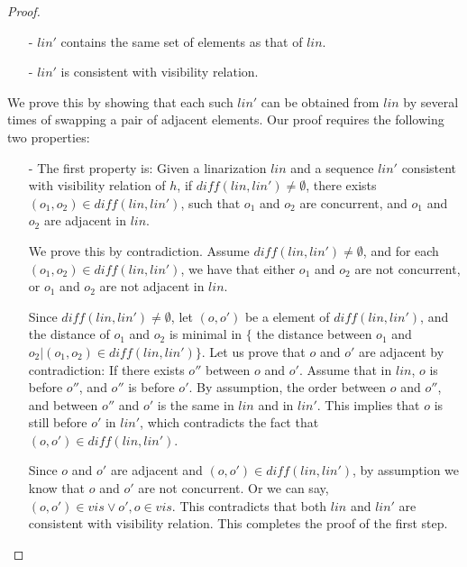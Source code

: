 {\begin {proof}
\begin{itemize}
\setlength{\itemsep}{0.5pt}
\item[-] $\mathit{lin}'$ contains the same set of elements as that of $\mathit{lin}$.

\item[-] $\mathit{lin}'$ is consistent with visibility relation.
\end{itemize}

We prove this by showing that each such $\mathit{lin}'$ can be obtained from $\mathit{lin}$ by several times of swapping a pair of adjacent elements. Our proof requires the following two properties:

\begin{itemize}
\setlength{\itemsep}{0.5pt}
\item[-] The first property is: Given a linarization $\mathit{lin}$ and a sequence $\mathit{lin}'$ consistent with visibility relation of $h$, if $\mathit{diff}(\mathit{lin},\mathit{lin}') \neq \emptyset$, there exists $(o_1,o_2) \in \mathit{diff}(\mathit{lin},\mathit{lin}')$, such that $o_1$ and $o_2$ are concurrent, and $o_1$ and $o_2$ are adjacent in $\mathit{lin}$.

    We prove this by contradiction. Assume $\mathit{diff}(\mathit{lin},\mathit{lin}') \neq \emptyset$, and for each $(o_1,o_2) \in \mathit{diff}(\mathit{lin},\mathit{lin}')$, we have that either $o_1$ and $o_2$ are not concurrent, or $o_1$ and $o_2$ are not adjacent in $\mathit{lin}$.

    Since $\mathit{diff}(\mathit{lin},\mathit{lin}') \neq \emptyset$, let $(o,o')$ be a element of $\mathit{diff}(\mathit{lin},\mathit{lin}')$, and the distance of $o_1$ and $o_2$ is minimal in $\{$ the distance between $o_1$ and $o_2 \vert (o_1,o_2) \in \mathit{diff}(\mathit{lin},\mathit{lin}') \}$. Let us prove that $o$ and $o'$ are adjacent by contradiction: If there exists $o''$ between $o$ and $o'$. Assume that in $\mathit{lin}$, $o$ is before $o''$, and $o''$ is before $o'$. By assumption, the order between $o$ and $o''$, and between $o''$ and $o'$ is the same in $\mathit{lin}$ and in $\mathit{lin}'$. This implies that $o$ is still before $o'$ in $\mathit{lin}'$, which contradicts the fact that $(o,o') \in \mathit{diff}(\mathit{lin},\mathit{lin}')$.

    Since $o$ and $o'$ are adjacent and $(o,o') \in \mathit{diff}(\mathit{lin},\mathit{lin}')$, by assumption we know that $o$ and $o'$ are not concurrent. Or we can say, $(o,o') \in \mathit{vis} \vee \mathit{o',o} \in \mathit{vis}$. This contradicts that both $\mathit{lin}$ and $\mathit{lin}'$ are consistent with visibility relation. This completes the proof of the first step.


\end{itemize}
\end{proof}}
